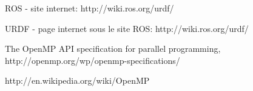 \begin{thebibliography}{9}



  ROS - site internet:
  http://wiki.ros.org/urdf/

  URDF - page internet sous le site ROS:
  http://wiki.ros.org/urdf/




  The OpenMP API specification for parallel programming,
  http://openmp.org/wp/openmp-specifications/

  http://en.wikipedia.org/wiki/OpenMP
  

%  

  

  
\end{thebibliography}
